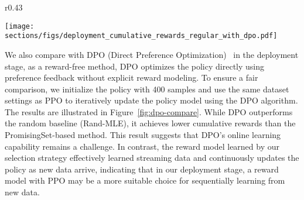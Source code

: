 \begin{wrapfigure}{r}{0.43\textwidth}
    \vspace{-6.5mm}
    \begin{center}
        \texttt{[image: sections/figs/deployment\_cumulative\_rewards\_regular\_with\_dpo.pdf]}
    \end{center}
    \vspace{-6mm}
    \caption{Comparison with DPO in the deployment stage.}
    \label{fig:dpo-compare}
    \vspace{-2mm}
\end{wrapfigure}
We also compare with DPO (Direct Preference Optimization)~\citep{NeurIPS'23:DPO} in the deployment stage, as a reward-free method, DPO optimizes the policy directly using preference feedback without explicit reward modeling. 
To ensure a fair comparison, we initialize the policy with 400 samples and use the same dataset settings as PPO to iteratively update the policy model using the DPO algorithm.
The results are illustrated in Figure~\ref{fig:dpo-compare}.
While DPO outperforms the random baseline (Rand-MLE), it achieves lower cumulative rewards than the PromisingSet-based method. This result suggests that DPO's online learning capability remains a challenge. In contrast, the reward model learned by our selection strategy effectively learned streaming data and continuously updates the policy as new data arrive, indicating that in our deployment stage, a reward model with PPO may be a more suitable choice for sequentially learning from new data.





